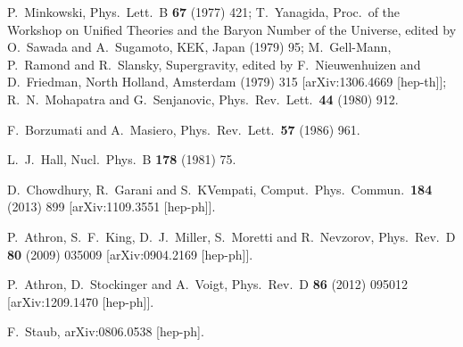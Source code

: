 \documentclass[final,3p,11pt,pdflatex]{elsarticle}
\newcommand{\ptitle}[1]{\emph{#1}}
\renewcommand{\ptitle}[1]{}
\begin{document}
\begin{thebibliography}{100}
  P.~Minkowski, \ptitle{
  $\mu \rightarrow e \gamma$ at a Rate of One Out of 1-Billion Muon Decays?,}
  Phys.\ Lett.\ B {\bf 67} (1977) 421;
  T.~Yanagida, \ptitle{
  Horizontal Symmetry And Masses Of Neutrinos,}
  Proc.\ of the
  Workshop on Unified Theories and the Baryon Number of the Universe,
  edited by O.~Sawada and A.~Sugamoto, KEK, Japan (1979) 95;
  M.~Gell-Mann, P.~Ramond and R.~Slansky, \ptitle{
  Complex Spinors and Unified Theories,}
  Supergravity, edited by F.~Nieuwenhuizen and
  D.~Friedman, North Holland, Amsterdam (1979) 315
  [arXiv:1306.4669 [hep-th]];
  R.~N.~Mohapatra and G.~Senjanovic, \ptitle{
  Neutrino Mass and Spontaneous Parity Nonconservation,}
  Phys.\ Rev.\ Lett.\  {\bf 44} (1980) 912.

  F.~Borzumati and A.~Masiero, \ptitle{
Large Muon- and electron-Number Nonconservation in Supergravity Theories,}
  Phys.\ Rev.\ Lett.\  {\bf 57} (1986) 961.

  L.~J.~Hall,
  Nucl.\ Phys.\ B {\bf 178} (1981) 75.

  D.~Chowdhury, R.~Garani and S.~KVempati,
  Comput.\ Phys.\ Commun.\  {\bf 184} (2013) 899
  [arXiv:1109.3551 [hep-ph]].

  P.~Athron, S.~F.~King, D.~J.~Miller, S.~Moretti and R.~Nevzorov,
  Phys.\ Rev.\ D {\bf 80} (2009) 035009
  [arXiv:0904.2169 [hep-ph]].

  P.~Athron, D.~Stockinger and A.~Voigt,
  Phys.\ Rev.\ D {\bf 86} (2012) 095012
  [arXiv:1209.1470 [hep-ph]].

  F.~Staub,
  arXiv:0806.0538 [hep-ph].

\end{thebibliography}
\end{document}
